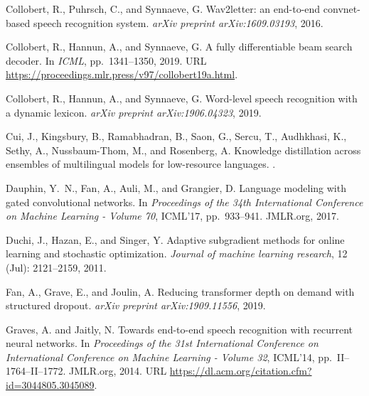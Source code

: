 \documentclass{article}
\begin{document}
\begin{thebibliography}{99}
Collobert, R., Puhrsch, C., and Synnaeve, G.
\newblock Wav2letter: an end-to-end convnet-based speech recognition system.
\newblock \emph{arXiv preprint arXiv:1609.03193}, 2016.

Collobert, R., Hannun, A., and Synnaeve, G.
\newblock A fully differentiable beam search decoder.
\newblock In \emph{ICML}, pp.\  1341--1350, 2019{}.
\newblock URL \url{https://proceedings.mlr.press/v97/collobert19a.html}.

Collobert, R., Hannun, A., and Synnaeve, G.
\newblock Word-level speech recognition with a dynamic lexicon.
\newblock \emph{arXiv preprint arXiv:1906.04323}, 2019{}.

Cui, J., Kingsbury, B., Ramabhadran, B., Saon, G., Sercu, T., Audhkhasi, K.,
  Sethy, A., Nussbaum-Thom, M., and Rosenberg, A.
\newblock Knowledge distillation across ensembles of multilingual models for
  low-resource languages.
.

Dauphin, Y.~N., Fan, A., Auli, M., and Grangier, D.
\newblock Language modeling with gated convolutional networks.
\newblock In \emph{Proceedings of the 34th International Conference on Machine
  Learning - Volume 70}, ICML'17, pp.\  933--941. JMLR.org, 2017.

Duchi, J., Hazan, E., and Singer, Y.
\newblock Adaptive subgradient methods for online learning and stochastic
  optimization.
\newblock \emph{Journal of machine learning research}, 12
  (Jul): 2121--2159, 2011.

Fan, A., Grave, E., and Joulin, A.
\newblock Reducing transformer depth on demand with structured dropout.
\newblock \emph{arXiv preprint arXiv:1909.11556}, 2019.

Graves, A. and Jaitly, N.
\newblock Towards end-to-end speech recognition with recurrent neural networks.
\newblock In \emph{Proceedings of the 31st International Conference on
  International Conference on Machine Learning - Volume 32}, ICML'14, pp.\
  II--1764--II--1772. JMLR.org, 2014.
\newblock URL \url{https://dl.acm.org/citation.cfm?id=3044805.3045089}.


\end{thebibliography}
\end{document}
